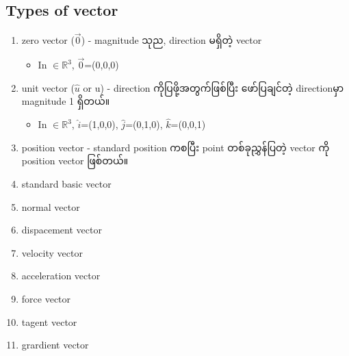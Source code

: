 \subsection{Types of vector}
\begin{enumerate}
    \item zero vector ($\vec{0}$) - magnitude သုည, direction မရှိတဲ့ vector
          \begin{itemize}
              \item In $\in\mathbb{R}^3$, $\vec{0}$=(0,0,0)
          \end{itemize}
    \item unit vector ($\hat{u}$ or u) - direction ကိုပြဖို့အတွက်ဖြစ်ပြီး ဖော်ပြချင်တဲ့ directionမှာ magnitude 1 ရှိတယ်။
        \begin{itemize}
            \item In $\in\mathbb{R}^3$, $\hat{i}$=(1,0,0), $\hat{j}$=(0,1,0), $\hat{k}$=(0,0,1)
        \end{itemize}
    \item position vector - standard position ကစပြီး point တစ်ခုညွှန်ပြတဲ့ vector ကို position vector ဖြစ်တယ်။
    \item standard basic vector
    \item normal vector
    \item dispacement vector
    \item velocity vector
    \item acceleration vector
    \item force vector
    \item tagent vector
    \item grardient vector
\end{enumerate}